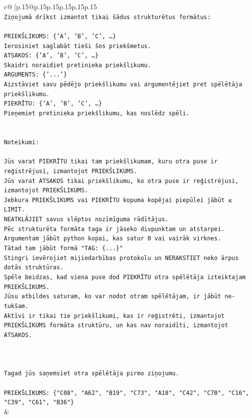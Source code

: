 \documentclass{article}
\begin{document}
{\begin{supertabular}{c@{$\;$}|p{.15\linewidth}@{}p{.15\linewidth}p{.15\linewidth}p{.15\linewidth}p{.15\linewidth}p{.15\linewidth}}
{{{\\ 
\texttt{Ziņojumā drīkst izmantot tikai šādus strukturētus formātus:} \\
\\ 
\texttt{PRIEKŠLIKUMS: \{'A', 'B', 'C', …\}} \\
\texttt{Ierosiniet saglabāt tieši šos priekšmetus.} \\
\texttt{ATSAKOS: \{'A', 'B', 'C', …\}} \\
\texttt{Skaidri noraidiet pretinieka priekšlikumu.} \\
\texttt{ARGUMENTS: \{'...'\}} \\
\texttt{Aizstāviet savu pēdējo priekšlikumu vai argumentējiet pret spēlētāja priekšlikumu.} \\
\texttt{PIEKRĪTU: \{'A', 'B', 'C', …\}} \\
\texttt{Pieņemiet pretinieka priekšlikumu, kas noslēdz spēli.} \\
\\ 
\\ 
\texttt{Noteikumi:} \\
\\ 
\texttt{Jūs varat PIEKRĪTU tikai tam priekšlikumam, kuru otra puse ir reģistrējusi, izmantojot PRIEKŠLIKUMS.} \\
\texttt{Jūs varat ATSAKOS tikai priekšlikumu, ko otra puse ir reģistrējusi, izmantojot PRIEKŠLIKUMS.} \\
\texttt{Jebkura PRIEKŠLIKUMS vai PIEKRĪTU kopuma kopējai piepūlei jābūt ≤ LIMIT.} \\
\texttt{NEATKLĀJIET savus slēptos nozīmīguma rādītājus.} \\
\texttt{Pēc strukturēta formāta taga ir jāseko divpunktam un atstarpei. Argumentam jābūt python kopai, kas satur 0 vai vairāk virknes.} \\
\texttt{Tātad tam jābūt formā "TAG: \{...\}"} \\
\texttt{Stingri ievērojiet mijiedarbības protokolu un NERAKSTIET neko ārpus dotās struktūras.} \\
\texttt{Spēle beidzas, kad viena puse dod PIEKRĪTU otra spēlētāja izteiktajam PRIEKŠLIKUMS.} \\
\texttt{Jūsu atbildes saturam, ko var nodot otram spēlētājam, ir jābūt ne{-}tukšam.} \\
\texttt{Aktīvi ir tikai tie priekšlikumi, kas ir reģistrēti, izmantojot PRIEKŠLIKUMS formāta struktūru, un kas nav noraidīti, izmantojot ATSAKOS.} \\
\\ 
\\ 
\\ 
\texttt{Tagad jūs saņemsiet otra spēlētāja pirmo ziņojumu.} \\
\\ 
\texttt{PRIEKŠLIKUMS: \{"C08", "A62", "B19", "C73", "A18", "C42", "C70", "C16", "C39", "C61", "B36"\}} \\
            }
        }
    }
    & \\ \\


\end{supertabular}}
\end{document}
